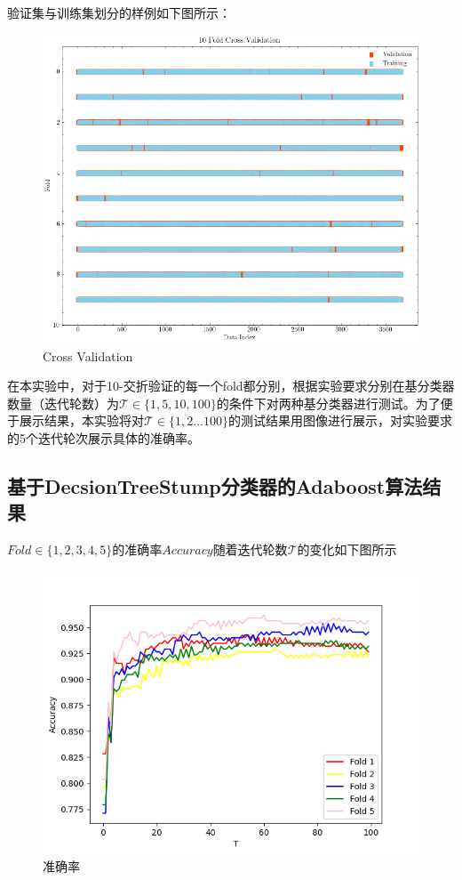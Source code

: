 \documentclass{paper}
\begin{document}
验证集与训练集划分的样例如下图所示：

\begin{figure}[H]
    \begin{center}
        \includegraphics[scale=0.50]{images/fold.png}
    \end{center}
    \caption{Cross Validation}
\end{figure}

在本实验中，对于10-交折验证的每一个fold都分别，根据实验要求分别在基分类器数量（迭代轮数）为$\mathcal{T} \in  \{1, 5, 10, 100\}$的条件下对两种基分类器进行测试。为了便于展示结果，本实验将对$\mathcal{T} \in  \{1, 2 \dots 100\}$的测试结果用图像进行展示，对实验要求的5个迭代轮次展示具体的准确率。

\subsection{基于DecsionTreeStump分类器的Adaboost算法结果} \label{acc}

$Fold \in \{1, 2, 3, 4, 5\}$的准确率$Accuracy$随着迭代轮数$\mathcal{T}$的变化如下图所示
\begin{figure}[H]
    \centering
    \includegraphics[scale=0.59]{images/foldacc.png}
    \caption{准确率}
\end{figure}
\end{document}
